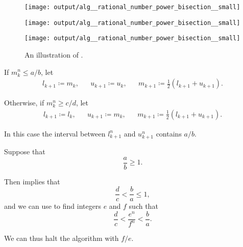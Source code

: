 \begin{algorithm}
\begin{thmenum}
\begin{thmenum}
      \begin{figure}[!ht]
        \begin{subcaptionblock}{\textwidth}
          \centering
          \texttt{[image: output/alg\_\_rational\_number\_power\_bisection\_\_small]}
        \end{subcaptionblock}

        \begin{subcaptionblock}{\textwidth}
          \centering
          \texttt{[image: output/alg\_\_rational\_number\_power\_bisection\_\_small]}
        \end{subcaptionblock}

        \begin{subcaptionblock}{\textwidth}
          \centering
          \texttt{[image: output/alg\_\_rational\_number\_power\_bisection\_\_small]}
        \end{subcaptionblock}

        \caption{An illustration of .}
        \label{fig:alg:rational_number_power_bisection/small}
      \end{figure}

      If \( m_k^n \leq a / b \), let
      \begin{align*}
        l_{k+1} \coloneqq m_k,
        &&
        u_{k+1} \coloneqq u_k,
        &&
        m_{k+1} \coloneqq \frac 1 2 (l_{k+1} + u_{k+1}).
      \end{align*}

      Otherwise, if \( m_k^n \geq c / d \), let
      \begin{align*}
        l_{k+1} \coloneqq l_k,
        &&
        u_{k+1} \coloneqq m_k,
        &&
        m_{k+1} \coloneqq \frac 1 2 (l_{k+1} + u_{k+1}).
      \end{align*}

      In this case the interval between \( l_{k+1}^n \) and \( u_{k+1}^n \) contains \( a / b \).
    \end{thmenum}

     Suppose that
    \begin{equation*}
      \frac a b \geq 1.
    \end{equation*}

    Then  implies that
    \begin{equation*}
      \frac d c < \frac b a \leq 1,
    \end{equation*}
    and we can use  to find integers \( e \) and \( f \) such that
    \begin{equation*}
      \frac d c < \frac {e^n} {f^n} < \frac b a.
    \end{equation*}

    We can thus halt the algorithm with \( f / e \).
  \end{thmenum}
\end{algorithm}
